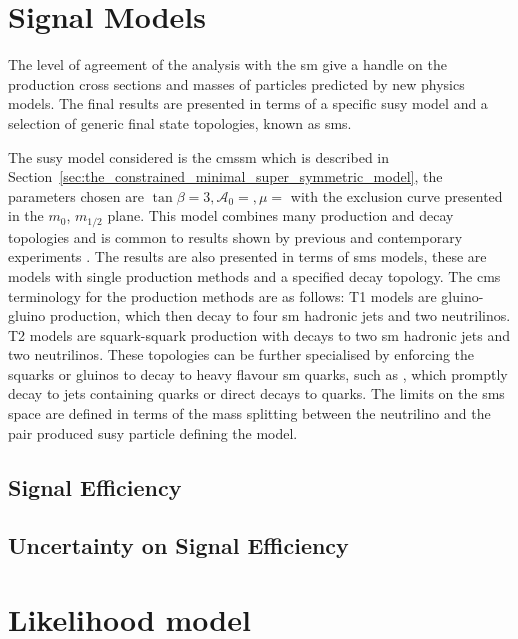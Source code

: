 \section{Signal Models} %
\label{sec:signal_models}
The level of agreement of the analysis with the \ac{sm} give a handle on the production cross sections and masses of particles predicted by new physics models. The final results are presented in terms of a specific \ac{susy} model and a selection of generic final state topologies, known as \ac{sms}.

The \ac{susy} model considered is the \ac{cmssm}\cite{null} which is described in Section~\ref{sec:the_constrained_minimal_super_symmetric_model}, the parameters chosen are $\tan\beta =3, \mathcal{A}_{0} = , \mu = $ with the exclusion curve presented in the $m_{0}$, $m_{1/2}$ plane. This model combines many production and decay topologies and is common to results shown by previous and contemporary experiments \cite{} .
The results are also presented in terms of \ac{sms}\cite{} models, these are models with single production methods and a specified decay topology. The \ac{cms} terminology for the production methods are as follows: T1 models are gluino-gluino production, which then decay to four \ac{sm} hadronic jets and two neutrilinos. T2 models are squark-squark production with decays to two \ac{sm} hadronic jets and two neutrilinos.
These topologies can be further specialised by enforcing the squarks or gluinos to decay to heavy flavour \ac{sm} quarks, such as \Ptop, which promptly decay to jets containing \Pbottom quarks or direct decays to \Pbottom quarks. The limits on the \ac{sms} space are defined in terms of the mass splitting between the neutrilino and the pair produced \ac{susy} particle defining the model.
\subsection{Signal Efficiency} %
\label{sub:signal_efficiency}


\subsection{Uncertainty on Signal Efficiency} %
\label{sub:uncertainty_on_signal_efficiency}





\section{Likelihood model} %
\label{sec:likelihood_model}


